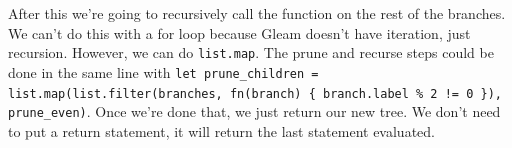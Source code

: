 \begin{blocksection}
\begin{questionmeta}
    After this we're going to recursively call the function on the rest of the branches. We can't do this with a for loop because Gleam doesn't have iteration, just recursion. However, we can do \lstinline{list.map}. The prune and recurse steps could be done in the same line with \lstinline|let prune_children = list.map(list.filter(branches, fn(branch) { branch.label % 2 != 0 }), prune_even)|.
    Once we're done that, we just return our new tree. We don't need to put a return statement, it will return the last statement evaluated.

\end{questionmeta}
\end{blocksection}